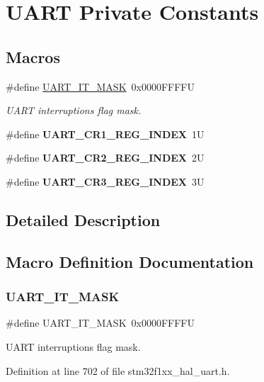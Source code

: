 \hypertarget{group___u_a_r_t___private___constants}{}\section{U\+A\+RT Private Constants}
\label{group___u_a_r_t___private___constants}
\subsection*{Macros}
\begin{DoxyCompactItemize}
\item 
\#define \hyperlink{group___u_a_r_t___private___constants_ga869439269c26e8dee93d49b1c7e67448}{U\+A\+R\+T\+\_\+\+I\+T\+\_\+\+M\+A\+SK}~0x0000\+F\+F\+F\+FU
\begin{DoxyCompactList}\small\item\em U\+A\+RT interruptions flag mask. \end{DoxyCompactList}\item 
\mbox{\label{group___u_a_r_t___private___constants_ga5917bcb19b2dab202b8cbfa82520b93e}} 
\#define {\bfseries U\+A\+R\+T\+\_\+\+C\+R1\+\_\+\+R\+E\+G\+\_\+\+I\+N\+D\+EX}~1U
\item 
\mbox{\label{group___u_a_r_t___private___constants_ga3a8b0ee44c75493eb001e60a9876e586}} 
\#define {\bfseries U\+A\+R\+T\+\_\+\+C\+R2\+\_\+\+R\+E\+G\+\_\+\+I\+N\+D\+EX}~2U
\item 
\mbox{\label{group___u_a_r_t___private___constants_gac9cb22110b40ab2261468436e3038524}} 
\#define {\bfseries U\+A\+R\+T\+\_\+\+C\+R3\+\_\+\+R\+E\+G\+\_\+\+I\+N\+D\+EX}~3U
\end{DoxyCompactItemize}


\subsection{Detailed Description}


\subsection{Macro Definition Documentation}
\mbox{\label{group___u_a_r_t___private___constants_ga869439269c26e8dee93d49b1c7e67448}} 
\subsubsection{\texorpdfstring{U\+A\+R\+T\+\_\+\+I\+T\+\_\+\+M\+A\+SK}{UART\_IT\_MASK}}
{\footnotesize\ttfamily \#define U\+A\+R\+T\+\_\+\+I\+T\+\_\+\+M\+A\+SK~0x0000\+F\+F\+F\+FU}



U\+A\+RT interruptions flag mask. 



Definition at line 702 of file stm32f1xx\+\_\+hal\+\_\+uart.\+h.

